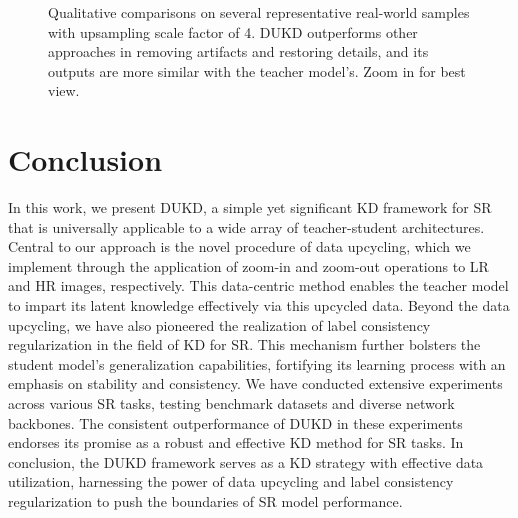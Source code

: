 \documentclass[10pt,twocolumn,letterpaper]{article}
\begin{document}
\begin{figure*}[h]
{\begin{minipage}{0.12\linewidth}
		\end{minipage}
	}
	
	
	\caption{Qualitative comparisons on several representative real-world samples with upsampling scale factor of 4. DUKD outperforms other approaches in removing artifacts and restoring details, and its outputs are more similar with the teacher model's. Zoom in for best view.}
	
	\label{fig:vis_real}
\end{figure*}  
\section{Conclusion}

In this work, we present DUKD, a simple yet significant KD framework for SR that is universally applicable to a wide array of teacher-student architectures. 
Central to our approach is the novel procedure of data upcycling, which we implement through the application of zoom-in and zoom-out operations to LR and HR images, respectively. This data-centric method enables the teacher model to impart its latent knowledge effectively via this upcycled data. Beyond the data upcycling, we have also pioneered the realization of label consistency regularization in the field of KD for SR. This mechanism further bolsters the student model's generalization capabilities, fortifying its learning process with an emphasis on stability and consistency. 
We have conducted extensive experiments across various SR tasks, testing benchmark datasets and diverse network backbones. The consistent outperformance of DUKD in these experiments endorses its promise as a
robust and effective KD method for SR tasks. 
In conclusion, the DUKD framework serves as a KD strategy with effective data utilization, harnessing the power of data upcycling and label consistency regularization to push the boundaries of SR model performance.
\newpage \clearpage
{
    \small
    
    
}
\end{document}
